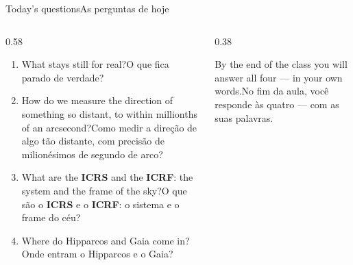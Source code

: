 \documentclass[aspectratio=169,11pt]{beamer}
\newcommand{\tr}[2]{\ifEN#2\else#1\fi}
\newcommand{\sist}[1]{\textcolor{corSist}{\textbf{#1}}}
\newcommand{\fram}[1]{\textcolor{corFrame}{\textbf{#1}}}
\begin{document}
\begin{frame}{\tr{As perguntas de hoje}{Today's questions}}
  \begin{columns}[T]
    \begin{column}{0.58\textwidth}
      \begin{enumerate}
        \setlength{\itemsep}{8pt}
        \item \tr{O que fica parado de verdade?}{What stays still for real?}
        \item \tr{Como medir a direção de algo tão distante, com precisão de milionésimos de
              segundo de arco?}{How do we measure the direction of something so distant, to
              within millionths of an arcsecond?}
        \item \tr{O que são o \sist{ICRS} e o \fram{ICRF}: o sistema e o frame do céu?}{What are
              the \sist{ICRS} and the \fram{ICRF}: the system and the frame of the sky?}
        \item \tr{Onde entram o Hipparcos e o Gaia?}{Where do Hipparcos and Gaia come in?}
      \end{enumerate}
    \end{column}
    \begin{column}{0.38\textwidth}
      \begin{ideia}[title={\tr{Combinado}{Deal}}]
        \tr{No fim da aula, você responde às quatro --- com as suas palavras.}{By the end of the
        class you will answer all four --- in your own words.}
      \end{ideia}
    \end{column}
  \end{columns}
\end{frame}
\end{document}
